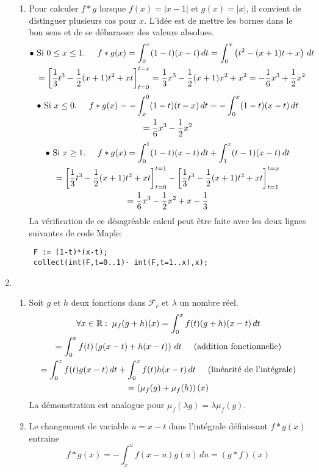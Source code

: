 \begin{enumerate}
\begin{enumerate}
 \item Pour calculer $f*g$ lorsque $f(x)=|x-1|$ et $g(x)=|x|$, il convient de distinguer plusieurs cas pour $x$. L'idée est de mettre les bornes dans le bon sens et de se débarasser des valeurs absolues.
\begin{multline*}
 \bullet \text{ Si }0\leq x \leq 1.\hspace{0,5cm}
f*g(x) = \int_0^x (1-t)(x-t)\,dt= \int_0^x \left(t^2 -(x+1)t+x \right) \,dt\\
=\left[\frac{1}{3}t^3 -\frac{1}{2}(x+1)t^2 +xt \right]_{t=0}^{t=x}= \frac{1}{3}x^3 - \frac{1}{2}(x+1)x^2 +x^2
 = -\frac{1}{6}x^3+\frac{1}{2}x^2
\end{multline*}
\begin{multline*}
 \bullet \text{ Si }x \leq 0.\hspace{0,5cm}
f*g(x) = - \int_x^0 (1-t)(t-x)\,dt= -\int_0^x (1-t)(x-t)\,dt\\ = \frac{1}{6}x^3 - \frac{1}{2}x^2
\end{multline*}
\begin{multline*}
 \bullet \text{ Si }x \geq 1.\hspace{0,5cm}
f*g(x) = \int_0^1 (1-t)(x-t)\,dt + \int_1^x (t-1)(x-t)\,dt\\
 = \left[\frac{1}{3}t^3 -\frac{1}{2}(x+1)t^2 +xt \right]_{t=0}^{t=1} 
   -\left[\frac{1}{3}t^3 -\frac{1}{2}(x+1)t^2 +xt \right]_{t=1}^{t=x}\\
= \frac{1}{6}x^3 -\frac{1}{2}x^2 +x -\frac{1}{3}
\end{multline*}
La vérification de ce désagréable calcul peut être faite avec les deux lignes suivantes de code Maple:
\begin{verbatim}
 F := (1-t)*(x-t);
 collect(int(F,t=0..1)- int(F,t=1..x),x);
\end{verbatim}
 
\end{enumerate}
 
 \item
\begin{enumerate}
 \item Soit $g$ et $h$ deux fonctions dans $\mathcal F_c$ et $\lambda$ un nombre réel.
\begin{multline*}
 \forall x\in \mathbb{R}: \;\mu_f(g+h)(x)
=\int_0^xf(t)(g+h)(x-t)\,dt \\
= \int_0^xf(t)\left(g(x-t)+h(x-t)\right) \,dt\hspace{0.5cm}\text{(addition fonctionnelle)}\\
=\int_0^xf(t)g(x-t)\,dt + \int_0^xf(t)h(x-t)\,dt\hspace{0.5cm}\text{(linéarité de l'intégrale)}\\
=\left( \mu_f(g)+\mu_f(h)\right)(x) 
\end{multline*}
La démonstration est analogue pour $\mu_f(\lambda g)=\lambda\mu_f(g)$.
 \item Le changement de variable $u=x-t$ dans l'intégrale définissant $f*g(x)$ entraine
\begin{displaymath}
 f*g(x) = -\int_x^uf(x-u)g(u)\,du = (g*f)(x)
\end{displaymath}


\end{enumerate}
\end{enumerate}
